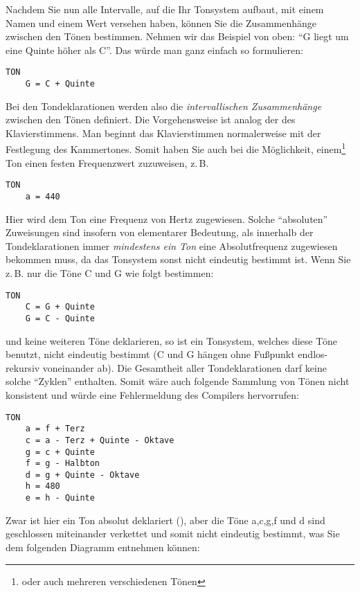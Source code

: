 Nachdem Sie nun alle Intervalle, auf die Ihr Tonsystem aufbaut,
mit einem Namen und einem Wert versehen haben, können Sie die
Zusammenhänge zwischen den Tönen bestimmen. Nehmen wir das
Beispiel von oben: "`G liegt um eine Quinte höher als C"'. Das würde
man ganz einfach so formulieren:
\begin{verbatim}
TON
    G = C + Quinte
\end{verbatim}
Bei den Tondeklarationen werden also die \emph{intervallischen
  Zusammenhänge} zwischen den Tönen definiert. Die Vorgehensweise ist
analog der des Klavierstimmens. Man beginnt das
Klavierstimmen normalerweise mit der Festlegung des Kammertones. Somit
haben Sie auch bei \mutabor{} die Möglichkeit, einem\footnote{oder
  auch mehreren verschiedenen Tönen} Ton einen festen Frequenzwert
zuzuweisen, z.\,B.
\begin{verbatim}
TON
    a = 440
\end{verbatim}
Hier wird dem Ton  eine Frequenz von  Hertz zugewiesen. Solche
"`absoluten"' Zuweisungen sind insofern von elementarer Bedeutung,
als innerhalb der Tondeklarationen immer \emph{mindestens ein Ton} eine
Absolutfrequenz zugewiesen bekommen muss, da das Tonsystem sonst
nicht eindeutig bestimmt ist. Wenn Sie z.\,B. nur die Töne C und G
wie folgt bestimmen:
\begin{verbatim}
TON
    C = G + Quinte
    G = C - Quinte
\end{verbatim}
und keine weiteren Töne deklarieren, so ist ein Tonsystem, welches
diese Töne benutzt, nicht eindeutig bestimmt (C und G hängen
ohne Fußpunkt endlos-rekursiv voneinander ab).
Die Gesamtheit aller Tondeklarationen darf keine solche "`Zyklen"'
enthalten. Somit wäre auch folgende Sammlung von Tönen nicht
konsistent und würde eine Fehlermeldung des Compilers hervorrufen:
\begin{verbatim}
TON
    a = f + Terz
    c = a - Terz + Quinte - Oktave
    g = c + Quinte
    f = g - Halbton
    d = g + Quinte - Oktave
    h = 480
    e = h - Quinte
\end{verbatim}
Zwar ist hier ein Ton absolut deklariert (), aber die Töne
a,c,g,f und d sind geschlossen miteinander verkettet und somit
nicht eindeutig bestimmt, was Sie dem folgenden Diagramm entnehmen können:




